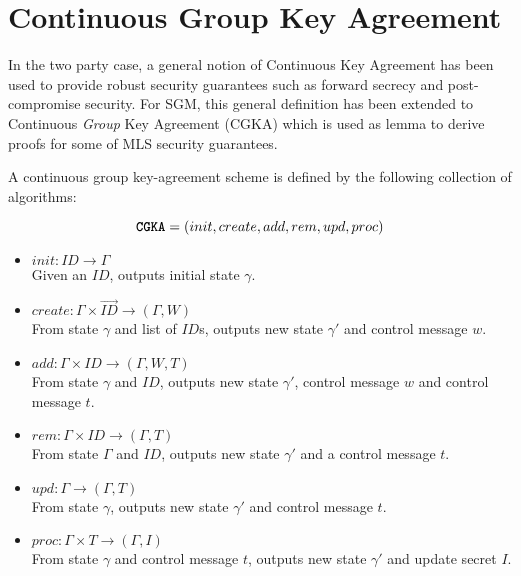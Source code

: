 \hypertarget{sec:CGKA}{%
\section{Continuous Group Key Agreement}\label{sec:CGKA}}

In the two party case, a general notion of Continuous Key Agreement \autocite{alwen2019double} has been used to provide robust security guarantees such as forward secrecy and post-compromise security.
For SGM, this general definition has been extended to Continuous \emph{Group} Key Agreement (CGKA) \autocite{alwen2020security} which is used as lemma to derive proofs for some of MLS security guarantees.

A continuous group key-agreement scheme is defined by the following collection of algorithms:

\[ \textbf{\texttt{CGKA}} = (init, create, add, rem, upd, proc)\]

\begin{itemize}
\item
  \(init : ID \to \Gamma\)\\
  Given an \(ID\), outputs initial state \(\gamma\).
\item
  \(create : \Gamma \times \overrightarrow{ID} \to (\Gamma, W)\)\\
  From state \(\gamma\) and list of \(ID\)s, outputs new state \(\gamma'\) and control message \(w\).
\item
  \(add : \Gamma \times ID \to (\Gamma, W, T)\)\\
  From state \(\gamma\) and \(ID\), outputs new state \(\gamma'\), control message \(w\) and control message \(t\).
\item
  \(rem : \Gamma \times ID \to (\Gamma, T)\)\\
  From state \(\Gamma\) and \(ID\), outputs new state \(\gamma'\) and a control message \(t\).
\item
  \(upd : \Gamma \to (\Gamma, T)\)\\
  From state \(\gamma\), outputs new state \(\gamma'\) and control message \(t\).
\item
  \(proc : \Gamma \times T \to (\Gamma, I)\)\\
  From state \(\gamma\) and control message \(t\), outputs new state \(\gamma'\) and update secret \(I\).
\end{itemize}


